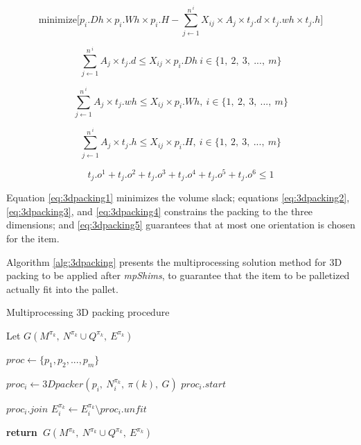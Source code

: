 \documentclass[preprint,authoryear]{elsarticle}
\renewcommand{\Return}{\State \bf {return}~}
\begin{document}
\begin{equation} \label{eq:3dpacking1}
	\mbox{minimize} \Big [ p_i.Dh \times p_i.Wh \times p_i.H - \sum_{j \gets 1}^{n^{\ i}} X_{ij} \times A_{j} \times t_j.d \times t_j.wh \times t_j.h \Big ]
\end{equation}

\begin{equation} \label{eq:3dpacking2}
	\sum_{j \gets 1}^{n^{\ i}} A_{j} \times t_j.d  \leq X_{ij} \times p_i.Dh\ i \in \{1,\ 2,\ 3,\ ...,\ m\}
\end{equation}

\begin{equation} \label{eq:3dpacking3}
	\sum_{j \gets 1}^{n^{\ i}} A_{j} \times t_j.wh  \leq X_{ij} \times p_i.Wh,\ i \in \{1,\ 2,\ 3,\ ...,\ m\}
\end{equation}

\begin{equation} \label{eq:3dpacking4}
	\sum_{j \gets 1}^{n^{\ i}} A_{j} \times t_j.h  \leq X_{ij} \times p_i.H,\ i \in \{1,\ 2,\ 3,\ ...,\ m\}
\end{equation}

\begin{equation} \label{eq:3dpacking5}
t_j.o^1 + t_j.o^2 + t_j.o^3 + t_j.o^4 + t_j.o^5 + t_j.o^6 \leq 1
\end{equation}

Equation \ref{eq:3dpacking1} minimizes the volume slack; equations \ref{eq:3dpacking2}, \ref{eq:3dpacking3}, and \ref{eq:3dpacking4} constrains the packing to the three dimensions; and \ref{eq:3dpacking5} guarantees that at most one orientation is chosen for the item.

Algorithm \ref{alg:3dpacking} presents the multiprocessing solution method for 3D packing to be applied after {\it mpShims}, to guarantee that the item to be palletized actually fit into the pallet.

\begin{algorithm}[H]
	\caption{Multiprocessing 3D packing procedure}  \label{alg:3dpacking}
	
	\begin{algorithmic}[1]
		
		
		\State Let $G(M^{\pi_k},\ N^{\pi_k} \cup Q^{\pi_k},\ E^{\pi_k})$ \label{3dpacking:1}
		
		\State $proc \gets \{p_1,p_2,..., p_m\}$ \label{3dpacking:2} 
		
		\State $proc_i \gets 3Dpacker(p_i,\ N^{\pi_k}_i,\ \pi(k),\ G )$   \label{3dpacking:3}
		\State $proc_i.start$
		\EndFor
		
		\State $proc_i.join$ \label{3dpacking:4}
		\State $E^{\pi_k}_i \gets E^{\pi_k}_i \setminus proc_i.unfit$  \label{3dpacking:5} 
		\EndFor
		
		\Return $G(M^{\pi_k},\ N^{\pi_k} \cup Q^{\pi_k},\ E^{\pi_k})$
		
		\EndProcedure
		
	\end{algorithmic}
\end{algorithm}
\end{document}
